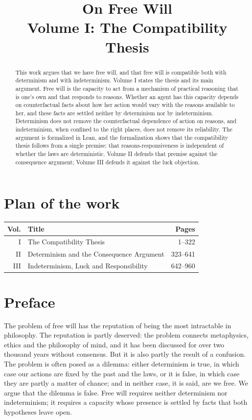 \documentclass{situationist-preprint}
\title{On Free Will\\[0.4em]\large Volume I: The Compatibility Thesis}
\begin{document}
\maketitle

\begin{abstract}
This work argues that we have free will, and that free will is compatible both with determinism and with indeterminism. Volume I states the thesis and its main argument. Free will is the capacity to act from a mechanism of practical reasoning that is one's own and that responds to reasons. Whether an agent has this capacity depends on counterfactual facts about how her action would vary with the reasons available to her, and these facts are settled neither by determinism nor by indeterminism. Determinism does not remove the counterfactual dependence of action on reasons, and indeterminism, when confined to the right places, does not remove its reliability. The argument is formalized in Lean, and the formalization shows that the compatibility thesis follows from a single premise: that reasons-responsiveness is independent of whether the laws are deterministic. Volume II defends that premise against the consequence argument; Volume III defends it against the luck objection.
\end{abstract}

\section*{Plan of the work}

\begin{center}\small
\begin{tabular}{@{}rlr@{}}
\toprule
Vol. & Title & Pages \\
\midrule
I & The Compatibility Thesis & 1--322 \\
II & Determinism and the Consequence Argument & 323--641 \\
III & Indeterminism, Luck and Responsibility & 642--960 \\
\bottomrule
\end{tabular}
\end{center}

\section*{Preface}

The problem of free will has the reputation of being the most intractable in philosophy. The reputation is partly deserved: the problem connects metaphysics, ethics and the philosophy of mind, and it has been discussed for over two thousand years without consensus. But it is also partly the result of a confusion. The problem is often posed as a dilemma: either determinism is true, in which case our actions are fixed by the past and the laws, or it is false, in which case they are partly a matter of chance; and in neither case, it is said, are we free. We argue that the dilemma is false. Free will requires neither determinism nor indeterminism; it requires a capacity whose presence is settled by facts that both hypotheses leave open.
\end{document}

